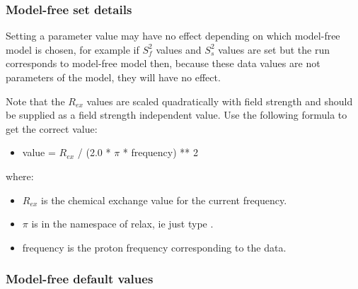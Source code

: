 \subsubsection{Model-free set details}

Setting a parameter value may have no effect depending on which model-free model is chosen,
for example if $S^2_f$ values and $S^2_s$ values are set but the run corresponds to model-free model
 then, because these data values are not parameters of the model, they will have no
effect.

Note that the $R_{ex}$ values are scaled quadratically with field strength and should be supplied
as a field strength independent value.  Use the following formula to get the correct value:

\begin{itemize}
\item[]     value = $R_{ex}$ / (2.0 * $\pi$ * frequency) ** 2
\end{itemize}

where:
\begin{itemize}
\item[]     $R_{ex}$ is the chemical exchange  value for the current frequency.
\item[]     $\pi$ is in the namespace of relax, ie just type 
.
\item[]     frequency is the proton frequency corresponding to the data.
\end{itemize}


\subsubsection{Model-free default values}



